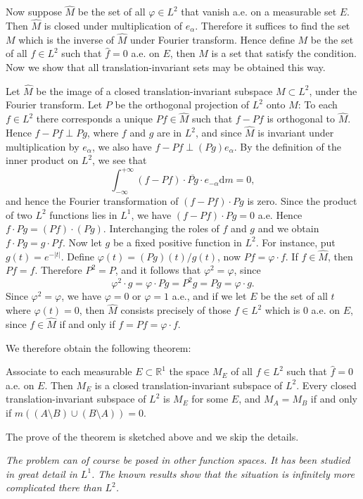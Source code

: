 Now suppose $\widehat{M}$ be the set of all $\varphi\in L^2$ that vanish a.e. on a measurable set $E$. Then $\widehat{M}$ is closed under multiplication of $e_\alpha$. Therefore it suffices to find the set $M$ which is the inverse of $\widehat{M}$ under Fourier transform. Hence define $M$ be the set of all $f\in L^2$ such that $\widehat{f}=0$ a.e. on $E$, then $M$ is a set that satisfy the condition. Now we show that all translation-invariant sets may be obtained this way.\par
Let $\widehat{M}$ be the image of a closed translation-invariant subspace $M\subset L^2$, under the Fourier transform. Let $P$ be the orthogonal projection of $L^2$ onto $M$: To each $f\in L^2$ there corresponds a unique $Pf\in\widehat{M}$ such that $f-Pf$ is orthogonal to $\widehat{M}$. Hence $f-Pf\perp Pg$, where $f$ and $g$ are in $L^2$, and since $\widehat{M}$ is invariant under multiplication by $e_\alpha$, we also have $f-Pf\perp (Pg)e_\alpha$. By the definition of the inner product on $L^2$, we see that 
$$
\int_{-\infty}^{+\infty}{\left( f-Pf \right) \cdot \overline{Pg}\cdot e_{-\alpha}\mathrm{d}m}=0,
$$
and hence the Fourier transformation of $(f-Pf)\cdot Pg$ is zero. Since the product of two $L^2$ functions lies in $L^1$, we have $(f-Pf)\cdot Pg=0$ a.e. Hence $f\cdot Pg=(Pf)\cdot(Pg)$. Interchanging the roles of $f$ and $g$ and we obtain $f\cdot Pg=g\cdot Pf$. Now let $g$ be a fixed positive function in $L^2$. For instance, put $g(t)=e^{-|t|}$. Define $\varphi(t)=(Pg)(t)/g(t)$, now $Pf=\varphi\cdot f$. If $f\in\widehat{M}$, then $Pf=f$. Therefore $P^2=P$, and it follows that $\varphi^2=\varphi$, since 
$$
\varphi ^2\cdot g=\varphi \cdot Pg=P^2g=Pg=\varphi \cdot g.
$$
Since $\varphi^2=\varphi$, we have $\varphi=0$ or $\varphi=1$ a.e., and if we let $E$ be the set of all $t$ where $\varphi(t)=0$, then $\widehat{M}$ consists precisely of those $f\in L^2$ which is $0$ a.e. on $E$, since $f\in\widehat{M}$ if and only if $f=Pf=\varphi\cdot f$.\par
We therefore obtain the following theorem: 
\begin{theorem}
Associate to each measurable $E\subset\mathbb{R}^1$ the space $M_E$ of all $f\in L^2$ such that $\widehat{f}=0$ a.e. on $E$. Then $M_E$ is a closed translation-invariant subspace of $L^2$. Every closed translation-invariant subspace of $L^2$ is $M_E$ for some $E$, and $M_A=M_B$ if and only if $m((A\setminus B)\cup(B\setminus A))=0.$
\end{theorem}
The prove of the theorem is sketched above and we skip the details.
\begin{note}\em
The problem can of course be posed in other function spaces. It has been studied in great detail in $L^1$. The known results show that the situation is infinitely more complicated there than $L^2$.
\end{note}

